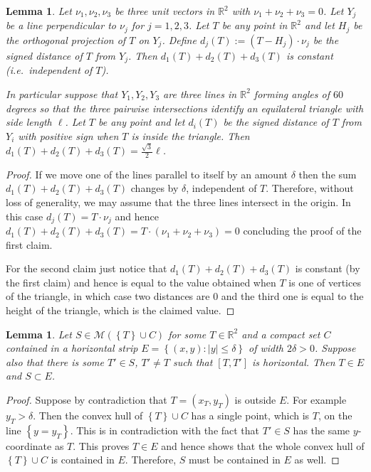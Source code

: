 \documentclass{amsart}
\newcommand{\RR}{\mathbb R}
\newcommand{\abs}[1]{\left\vert #1 \right\vert}
\newcommand{\ENCLOSE}[1]{\left\{#1\right\}}
\newcommand{\M}{\mathcal{M}}
\newtheorem{lemma}[theorem]{Lemma}
\theoremstyle{definition}
\theoremstyle{remark}
\begin{document}
  \begin{lemma}\label{lm:tripod}
    Let $\nu_1,\nu_2,\nu_3$ be three unit vectors in $\RR^2$
    with $\nu_1+\nu_2+\nu_3=0$. 
    Let $Y_j$ be a line perpendicular to $\nu_j$ for $j=1,2,3$.
    Let $T$ be any point in $\RR^2$ and let $H_j$ be the orthogonal 
    projection of $T$ on $Y_j$.
    Define $d_j(T) := (T-H_j)\cdot \nu_j$
    be the signed distance of $T$ from $Y_j$.
    Then $d_1(T) + d_2(T) + d_3(T)$ is constant 
    (i.e.\ independent of $T$).
  
    In particular suppose that  
    $Y_1,Y_2,Y_3$ are three lines in $\RR^2$
    forming angles of $60$ degrees so that 
    the three pairwise intersections identify
    an equilateral triangle with side length $\ell$.
    Let $T$ be any point and let $d_i(T)$ be 
    the signed distance of $T$ from $Y_i$
    with positive sign when $T$ is inside the triangle.
    Then $d_1(T) + d_2(T) + d_3(T) = \frac{\sqrt 3}{2}\ell$.
  \end{lemma}
  \begin{proof}
    If we move one of the lines parallel to itself by an amount $\delta$ 
    then the sum $d_1(T)+d_2(T)+d_3(T)$ changes by $\delta$, independent 
    of $T$.
    Therefore, without loss of generality, we may assume that the three lines 
    intersect in the origin.
    In this case $d_j(T) = T\cdot \nu_j$ and hence 
    $d_1(T)+d_2(T)+d_3(T) = T\cdot (\nu_1+\nu_2+\nu_3) = 0$
    concluding the proof of the first claim.
  
    For the second claim just notice that $d_1(T)+d_2(T)+d_3(T)$
    is constant (by the first claim) and hence is equal to the value 
    obtained when $T$ is one of vertices of the triangle, in which case 
    two distances are $0$ and the third one is equal to the height of the
    triangle, which is the claimed value.
  \end{proof}
  
\begin{lemma}\label{lm:envelope}
Let $S\in \M(\ENCLOSE{T}\cup C)$
for some $T\in \RR^2$ and a compact set $C$ contained in a horizontal strip 
$E=\ENCLOSE{(x,y)\colon \abs{y}\le \delta}$ of width $2\delta>0$.
Suppose also that there is some $T'\in S$, $T'\neq T$ 
such that $[T,T']$ is horizontal.
Then $T\in E$ and $S\subset E$.
\end{lemma}
%
\begin{proof}
  Suppose by contradiction that $T=(x_T,y_T)$ is outside $E$.
  For example $y_T>\delta$. 
  Then the convex hull of $\ENCLOSE{T}\cup C$ has a single 
  point, which is $T$, on the line $\ENCLOSE{y=y_T}$. 
  This is in contradiction with the fact that $T'\in S$ 
  has the same $y$-coordinate as $T$.
  This proves $T\in E$ and hence
  shows that the whole convex hull of 
  $\ENCLOSE{T}\cup C$ is contained in $E$. 
  Therefore, $S$ must be contained in $E$ as well.
\end{proof}
\end{document}
